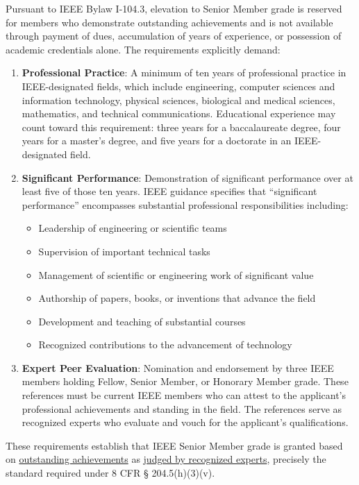 Pursuant to IEEE Bylaw I-104.3, elevation to Senior Member grade is reserved for members who demonstrate outstanding achievements and is not available through payment of dues, accumulation of years of experience, or possession of academic credentials alone. The requirements explicitly demand:

\begin{enumerate}
    \item \textbf{Professional Practice}: A minimum of ten years of professional practice in IEEE-designated fields, which include engineering, computer sciences and information technology, physical sciences, biological and medical sciences, mathematics, and technical communications. Educational experience may count toward this requirement: three years for a baccalaureate degree, four years for a master's degree, and five years for a doctorate in an IEEE-designated field.
    
    \item \textbf{Significant Performance}: Demonstration of significant performance over at least five of those ten years. IEEE guidance specifies that ``significant performance'' encompasses substantial professional responsibilities including:
    \begin{itemize}
        \item Leadership of engineering or scientific teams
        \item Supervision of important technical tasks
        \item Management of scientific or engineering work of significant value
        \item Authorship of papers, books, or inventions that advance the field
        \item Development and teaching of substantial courses
        \item Recognized contributions to the advancement of technology
    \end{itemize}
    
    \item \textbf{Expert Peer Evaluation}: Nomination and endorsement by three IEEE members holding Fellow, Senior Member, or Honorary Member grade. These references must be current IEEE members who can attest to the applicant's professional achievements and standing in the field. The references serve as recognized experts who evaluate and vouch for the applicant's qualifications.
\end{enumerate}

These requirements establish that IEEE Senior Member grade is granted based on \underline{outstanding achievements} as \underline{judged by recognized experts}, precisely the standard required under 8 CFR § 204.5(h)(3)(v).

